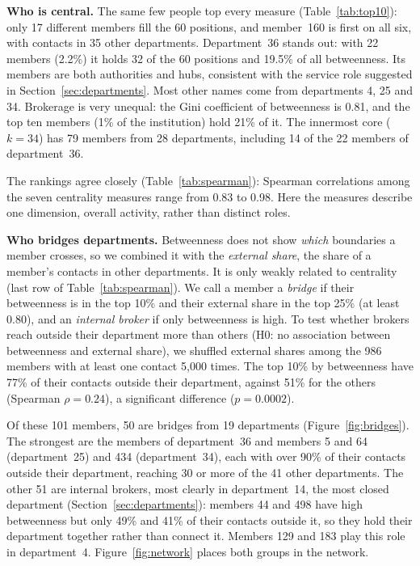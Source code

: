\textbf{Who is central.} The same few people top every measure
(Table~\ref{tab:top10}): only 17 different members fill the 60 positions,
and member~160 is first on all six, with contacts in 35 other departments.
Department~36 stands out: with 22 members (2.2\%) it holds 32 of the 60
positions and 19.5\% of all betweenness. Its members are both authorities and
hubs, consistent with the service role suggested in
Section~\ref{sec:departments}. Most other names come from departments 4, 25
and 34. Brokerage is very unequal: the Gini coefficient of betweenness is
0.81, and the top ten members (1\% of the institution) hold 21\% of it. The
innermost core ($k=34$) has 79 members from 28 departments, including 14 of
the 22 members of department~36.

The rankings agree closely (Table~\ref{tab:spearman}): Spearman correlations
among the seven centrality measures range from 0.83 to 0.98. Here the measures
describe one dimension, overall activity, rather than distinct roles.

\textbf{Who bridges departments.} Betweenness does not show \emph{which}
boundaries a member crosses, so we combined it with the \emph{external
share}, the share of a member's contacts in other departments. It is only
weakly related to centrality (last row of Table~\ref{tab:spearman}). We call
a member a \emph{bridge} if their betweenness is in the top 10\% and their
external share in the top 25\% (at least 0.80), and an \emph{internal broker}
if only betweenness is high. To test whether brokers reach outside their
department more than others (H0: no association between betweenness and
external share), we shuffled external shares among the 986 members with at
least one contact 5{,}000 times. The top 10\% by betweenness have 77\% of
their contacts outside their department, against 51\% for the others
(Spearman $\rho=0.24$), a significant difference ($p=0.0002$).

Of these 101 members, 50 are bridges from 19 departments
(Figure~\ref{fig:bridges}). The strongest are the members of department~36
and members 5 and 64 (department~25) and 434 (department~34), each with over
90\% of their contacts outside their department, reaching 30 or more of the
41 other departments. The other 51 are internal brokers, most clearly in
department~14, the most closed department (Section~\ref{sec:departments}):
members 44 and 498 have high betweenness but only 49\% and 41\% of their
contacts outside it, so they hold their department together rather than
connect it. Members 129 and 183 play this role in department~4.
Figure~\ref{fig:network} places both groups in the network.

